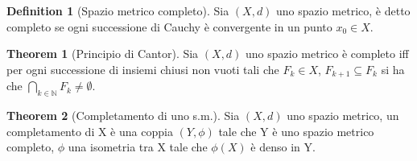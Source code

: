\documentclass[leqno]{article}
\theoremstyle{definition}
\newtheorem{definition}{Definition}[section]
\numberwithin{equation}{section}
\newtheorem{theorem}{Theorem}[section]
\theoremstyle{remark}
\begin{document}
	\begin{definition}[Spazio metrico completo]
		Sia $(X,d)$ uno spazio metrico, è detto completo se ogni successione di Cauchy è convergente in un punto $x_0 \in X$.
	\end{definition}
	
	\begin{theorem}[Principio di Cantor]
		Sia $(X,d)$ uno spazio metrico è completo iff per ogni successione di insiemi chiusi non vuoti tali che $F_k \in X$, $F_{k+1} \subseteq F_k$ si ha che $\bigcap_{k\in\mathbb{N}}F_k\neq \emptyset$.
	\end{theorem}
	\begin{theorem}[Completamento di uno s.m.]
		Sia $(X,d)$ uno spazio metrico, un completamento di X è una coppia $(Y,\phi)$ tale che Y è uno spazio metrico completo, $\phi$ una isometria tra X tale che $\phi(X)$ è denso in Y.
	\end{theorem}
\end{document}
